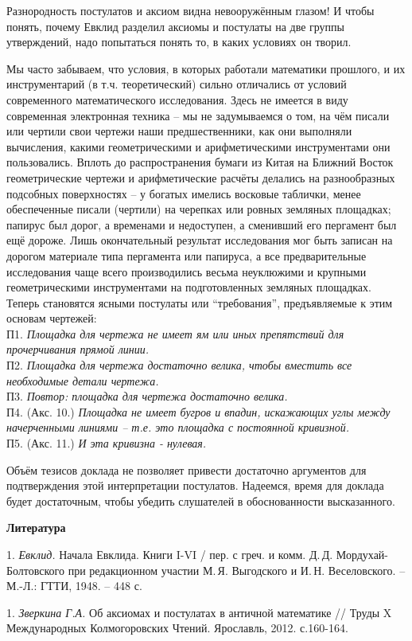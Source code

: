Разнородность постулатов и аксиом видна невооружённым глазом!
И чтобы понять, почему Евклид разделил аксиомы и постулаты на две группы утверждений, надо попытаться понять то, в каких условиях он творил.

Мы часто забываем, что условия, в которых работали математики прошлого, и их инструментарий (в т.ч. теоретический) сильно отличались от условий современного математического исследования.
Здесь не имеется в виду современная электронная техника -- мы не задумываемся о том, на чём писали или чертили свои чертежи наши предшественники, как они выполняли вычисления, какими геометрическими и арифметическими инструментами они пользовались.
Вплоть до распространения бумаги из Китая на Ближний Восток геометрические чертежи и арифметические расчёты делались на разнообразных подсобных поверхностях -- у богатых имелись восковые таблички, менее обеспеченные писали (чертили) на черепках или ровных земляных пло\-щад\-ках; папирус был дорог, а временами и недоступен, а сменивший его пергамент был ещё дороже.
Лишь окончательный результат исследования мог быть записан на дорогом материале типа пергамента или папируса, а все предварительные исследования чаще всего  производились весьма неуклюжими и крупными геометрическими инструментами на подготовленных земляных площадках.
Теперь становятся ясными постулаты или ``требования'', предъявляемые к этим основам чертежей:
\\
П1. {\it Площадка для чертежа не имеет ям или иных препятствий для прочерчивания прямой линии.}
\\
П2. {\it Пло\-щад\-ка для чер\-те\-жа до\-ста\-точ\-но ве\-ли\-ка, что\-бы \linebreak вмес\-тить все необходимые детали чертежа.}
\\
П3. {\it Повтор: площадка для чертежа достаточно велика.}
\\
П4. (Акс. 10.) {\it  Площадка не имеет бугров и впадин, искажающих углы между начерченными линиями -- т.е. это площадка с постоянной кривизной.}
\\
П5. (Акс. 11.) {\it  И эта кривизна - нулевая.}

Объём тезисов доклада не позволяет привести достаточно аргументов для подтверждения этой интерпретации постулатов.
Надеемся, время для доклада будет достаточным, чтобы убедить слушателей в обоснованности высказанного.





\smallskip \centerline{\bf Литература}\nopagebreak

1. {\it Евклид.} Начала Евклида. Книги I-VI  / пер. с греч. и комм. Д.\,Д. Мор\-ду\-хай-Бол\-тов\-ско\-го при редакционном
участии М.\,Я. Вы\-год\-ско\-го и И.\,Н. Веселовского. -- М.-Л.: ГТТИ, 1948. -- 448 с.

1. {\it Зверкина Г.А.} Об аксиомах и постулатах в античной математике // Труды X Международных Колмогоровских Чтений. Ярославль,
2012.  с.160-164.
